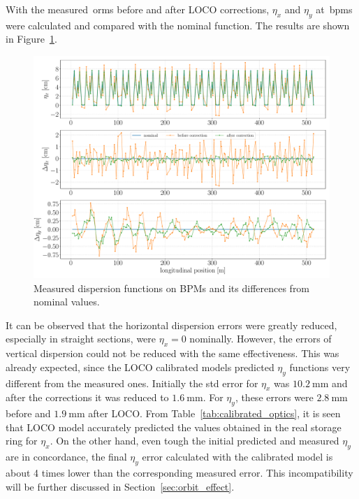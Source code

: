 With the measured~\gls{orm}s before and after LOCO corrections, $\eta_x$ and $\eta_y$ at~\glspl{bpm} were calculated and compared with the nominal function. The results are shown in Figure~\ref{fig:disp_error}. 
\begin{figure}
\centering
\includegraphics[width=1.0\textwidth]{figures/dispersion_after_before_loco_legend.pdf}
\caption{Measured dispersion functions on BPMs and its differences from nominal values.}
\label{fig:disp_error}
\end{figure}

It can be observed that the horizontal dispersion errors were greatly reduced, especially in straight sections, were $\eta_x = 0$ nominally. However, the errors of vertical dispersion could not be reduced with the same effectiveness. This was already expected, since the LOCO calibrated models predicted $\eta_y$ functions very different from the measured ones. Initially the std error for $\eta_x$ was $\SI{10.2}{\milli\meter}$ and after the corrections it was reduced to $\SI{1.6}{\milli\meter}$. For $\eta_y$, these errors were $\SI{2.8}{\milli\meter}$ before and $\SI{1.9}{\milli\meter}$ after LOCO. From Table~\ref{tab:calibrated_optics}, it is seen that LOCO model accurately predicted the values obtained in the real storage ring for $\eta_x$. On the other hand, even tough the initial predicted and measured  $\eta_y$ are in concordance, the final $\eta_y$ error calculated with the calibrated model is about 4 times lower than the corresponding measured error. This incompatibility will be further discussed in Section~\ref{sec:orbit_effect}.

